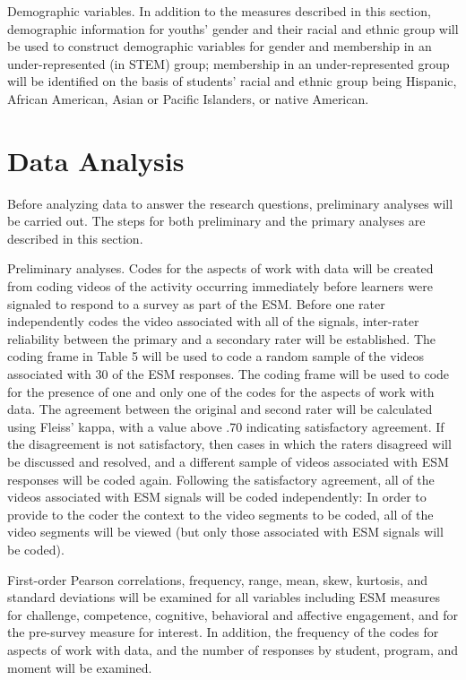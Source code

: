 \documentclass[]{book}
\theoremstyle{definition}
\theoremstyle{definition}
\theoremstyle{definition}
\theoremstyle{remark}
\begin{document}
Demographic variables. In addition to the measures described in this
section, demographic information for youths' gender and their racial and
ethnic group will be used to construct demographic variables for gender
and membership in an under-represented (in STEM) group; membership in an
under-represented group will be identified on the basis of students'
racial and ethnic group being Hispanic, African American, Asian or
Pacific Islanders, or native American.

\section{Data Analysis}\label{data-analysis}

Before analyzing data to answer the research questions, preliminary
analyses will be carried out. The steps for both preliminary and the
primary analyses are described in this section.

Preliminary analyses. Codes for the aspects of work with data will be
created from coding videos of the activity occurring immediately before
learners were signaled to respond to a survey as part of the ESM. Before
one rater independently codes the video associated with all of the
signals, inter-rater reliability between the primary and a secondary
rater will be established. The coding frame in Table 5 will be used to
code a random sample of the videos associated with 30 of the ESM
responses. The coding frame will be used to code for the presence of one
and only one of the codes for the aspects of work with data. The
agreement between the original and second rater will be calculated using
Fleiss' kappa, with a value above .70 indicating satisfactory agreement.
If the disagreement is not satisfactory, then cases in which the raters
disagreed will be discussed and resolved, and a different sample of
videos associated with ESM responses will be coded again. Following the
satisfactory agreement, all of the videos associated with ESM signals
will be coded independently: In order to provide to the coder the
context to the video segments to be coded, all of the video segments
will be viewed (but only those associated with ESM signals will be
coded).

First-order Pearson correlations, frequency, range, mean, skew,
kurtosis, and standard deviations will be examined for all variables
including ESM measures for challenge, competence, cognitive, behavioral
and affective engagement, and for the pre-survey measure for interest.
In addition, the frequency of the codes for aspects of work with data,
and the number of responses by student, program, and moment will be
examined.
\end{document}
